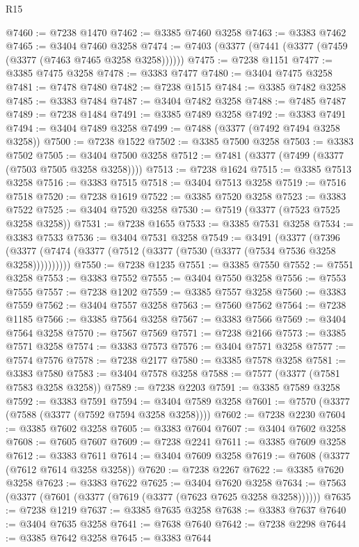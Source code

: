 \begin{lexlean}{R15}
\begin{coremodule}
@7460 := @7238 @1470
@7462 := @3385 @7460 @3258
@7463 := @3383 @7462
@7465 := @3404 @7460 @3258
@7474 := @7403 (@3377 (@7441 (@3377 (@7459 (@3377 (@7463 @7465 @3258 @3258))))))
@7475 := @7238 @1151
@7477 := @3385 @7475 @3258
@7478 := @3383 @7477
@7480 := @3404 @7475 @3258
@7481 := @7478 @7480
@7482 := @7238 @1515
@7484 := @3385 @7482 @3258
@7485 := @3383 @7484
@7487 := @3404 @7482 @3258
@7488 := @7485 @7487
@7489 := @7238 @1484
@7491 := @3385 @7489 @3258
@7492 := @3383 @7491
@7494 := @3404 @7489 @3258
@7499 := @7488 (@3377 (@7492 @7494 @3258 @3258))
@7500 := @7238 @1522
@7502 := @3385 @7500 @3258
@7503 := @3383 @7502
@7505 := @3404 @7500 @3258
@7512 := @7481 (@3377 (@7499 (@3377 (@7503 @7505 @3258 @3258))))
@7513 := @7238 @1624
@7515 := @3385 @7513 @3258
@7516 := @3383 @7515
@7518 := @3404 @7513 @3258
@7519 := @7516 @7518
@7520 := @7238 @1619
@7522 := @3385 @7520 @3258
@7523 := @3383 @7522
@7525 := @3404 @7520 @3258
@7530 := @7519 (@3377 (@7523 @7525 @3258 @3258))
@7531 := @7238 @1655
@7533 := @3385 @7531 @3258
@7534 := @3383 @7533
@7536 := @3404 @7531 @3258
@7549 := @3491
    (@3377
      (@7396 (@3377 (@7474 (@3377 (@7512 (@3377 (@7530 (@3377 (@7534 @7536 @3258 @3258))))))))))
@7550 := @7238 @1235
@7551 := @3385 @7550
@7552 := @7551 @3258
@7553 := @3383 @7552
@7555 := @3404 @7550 @3258
@7556 := @7553 @7555
@7557 := @7238 @1202
@7559 := @3385 @7557 @3258
@7560 := @3383 @7559
@7562 := @3404 @7557 @3258
@7563 := @7560 @7562
@7564 := @7238 @1185
@7566 := @3385 @7564 @3258
@7567 := @3383 @7566
@7569 := @3404 @7564 @3258
@7570 := @7567 @7569
@7571 := @7238 @2166
@7573 := @3385 @7571 @3258
@7574 := @3383 @7573
@7576 := @3404 @7571 @3258
@7577 := @7574 @7576
@7578 := @7238 @2177
@7580 := @3385 @7578 @3258
@7581 := @3383 @7580
@7583 := @3404 @7578 @3258
@7588 := @7577 (@3377 (@7581 @7583 @3258 @3258))
@7589 := @7238 @2203
@7591 := @3385 @7589 @3258
@7592 := @3383 @7591
@7594 := @3404 @7589 @3258
@7601 := @7570 (@3377 (@7588 (@3377 (@7592 @7594 @3258 @3258))))
@7602 := @7238 @2230
@7604 := @3385 @7602 @3258
@7605 := @3383 @7604
@7607 := @3404 @7602 @3258
@7608 := @7605 @7607
@7609 := @7238 @2241
@7611 := @3385 @7609 @3258
@7612 := @3383 @7611
@7614 := @3404 @7609 @3258
@7619 := @7608 (@3377 (@7612 @7614 @3258 @3258))
@7620 := @7238 @2267
@7622 := @3385 @7620 @3258
@7623 := @3383 @7622
@7625 := @3404 @7620 @3258
@7634 := @7563 (@3377 (@7601 (@3377 (@7619 (@3377 (@7623 @7625 @3258 @3258))))))
@7635 := @7238 @1219
@7637 := @3385 @7635 @3258
@7638 := @3383 @7637
@7640 := @3404 @7635 @3258
@7641 := @7638 @7640
@7642 := @7238 @2298
@7644 := @3385 @7642 @3258
@7645 := @3383 @7644

\end{coremodule}
\end{lexlean}

